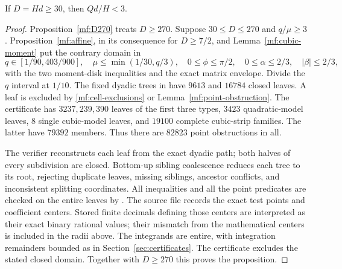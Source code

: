 \begin{proposition}\label{mf:D30}
If $D=Hd\ge30$, then $Qd/H<3$.
\end{proposition}
\begin{proof}
Proposition~\ref{mf:D270} treats $D\ge270$. Suppose
$30\le D\le270$ and $q/\mu\ge3$.
Proposition~\ref{mf:affine}, in its consequence for $D\ge7/2$,
and Lemma~\ref{mf:cubic-moment} put the contrary domain in
\[
 q\in[1/90,403/900],\quad
 \mu\le\min(1/30,q/3),\quad
 0\le\phi\le\pi/2,\quad
 0\le\alpha\le2/3,\quad|\beta|\le2/3,
\]
with the two moment-disk inequalities and the exact matrix
envelope. Divide the $q$ interval at $1/10$.
The fixed dyadic trees in
have $9613$ and $16784$ closed leaves. A leaf is excluded by
\eqref{mf:cell-exclusions} or Lemma~\ref{mf:point-obstruction}.
The certificate has $3237,239,390$ leaves of the first three
types, $3423$ quadratic-model leaves, $8$ single cubic-model
leaves, and $19100$ complete cubic-strip families.
The latter have $79392$ members. Thus there are $82823$
point obstructions in all.

The verifier reconstructs each leaf from the exact dyadic
path; both halves of every subdivision are closed. Bottom-up
sibling coalescence reduces each tree to its root,
rejecting duplicate leaves, missing siblings, ancestor conflicts,
and inconsistent splitting coordinates. All inequalities and
all the point predicates are checked on the entire leaves by
.
The source file records the exact test points and coefficient
centers. Stored finite decimals defining those centers are
interpreted as their exact binary rational values; their
mismatch from the mathematical centers is included in the
radii above. The integrands are entire, with integration remainders
bounded as in Section~\ref{sec:certificates}.
The certificate excludes the stated closed domain.
Together with $D\ge270$ this proves the proposition.
\end{proof}

